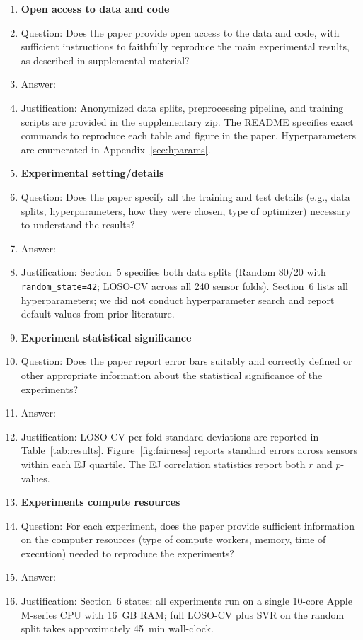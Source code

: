 \begin{enumerate}
\item {\bf Open access to data and code}
    \item[] Question: Does the paper provide open access to the data and code, with sufficient instructions to faithfully reproduce the main experimental results, as described in supplemental material?
    \item[] Answer: \answerYes{}
    \item[] Justification: Anonymized data splits, preprocessing pipeline, and training scripts are provided in the supplementary zip. The README specifies exact commands to reproduce each table and figure in the paper. Hyperparameters are enumerated in Appendix~\ref{sec:hparams}.

\item {\bf Experimental setting/details}
    \item[] Question: Does the paper specify all the training and test details (e.g., data splits, hyperparameters, how they were chosen, type of optimizer) necessary to understand the results?
    \item[] Answer: \answerYes{}
    \item[] Justification: Section~5 specifies both data splits (Random 80/20 with \texttt{random\_state=42}; LOSO-CV across all 240 sensor folds). Section~6 lists all hyperparameters; we did not conduct hyperparameter search and report default values from prior literature.

\item {\bf Experiment statistical significance}
    \item[] Question: Does the paper report error bars suitably and correctly defined or other appropriate information about the statistical significance of the experiments?
    \item[] Answer: \answerYes{}
    \item[] Justification: LOSO-CV per-fold standard deviations are reported in Table~\ref{tab:results}. Figure~\ref{fig:fairness} reports standard errors across sensors within each EJ quartile. The EJ correlation statistics report both $r$ and $p$-values.

\item {\bf Experiments compute resources}
    \item[] Question: For each experiment, does the paper provide sufficient information on the computer resources (type of compute workers, memory, time of execution) needed to reproduce the experiments?
    \item[] Answer: \answerYes{}
    \item[] Justification: Section~6 states: all experiments run on a single 10-core Apple M-series CPU with 16~GB RAM; full LOSO-CV plus SVR on the random split takes approximately 45~min wall-clock.


\end{enumerate}

